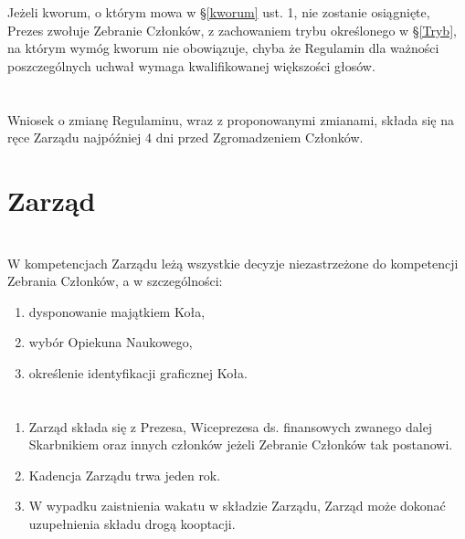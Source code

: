 \documentclass[a4paper]{article}
\begin{document}
\section{}
Jeżeli kworum, o którym mowa w \S \ref{kworum} ust. 1, nie zostanie osiągnięte, Prezes zwołuje Zebranie Członków, z zachowaniem trybu określonego w \S \ref{Tryb}, na którym wymóg kworum nie obowiązuje, chyba że Regulamin dla ważności poszczególnych uchwał wymaga kwalifikowanej większości głosów. 

\section{}
Wniosek o zmianę Regulaminu, wraz z proponowanymi zmianami, składa się na ręce Zarządu najpóźniej 4 dni przed Zgromadzeniem Członków.

\section*{Zarząd~~~}
\section{}
W kompetencjach Zarządu leżą wszystkie decyzje niezastrzeżone do kompetencji Zebrania Członków, a w szczególności:
\begin{enumerate}[label=\alph*)]
\item dysponowanie majątkiem Koła,
\item wybór Opiekuna Naukowego,
\item określenie identyfikacji graficznej Koła.
\end{enumerate}

\section{}
\begin{enumerate}
\item Zarząd składa się z Prezesa, Wiceprezesa ds. finansowych zwanego dalej Skarbnikiem oraz innych członków jeżeli Zebranie Członków tak postanowi.
\item Kadencja Zarządu trwa jeden rok.
\item W wypadku zaistnienia wakatu w składzie Zarządu, Zarząd może dokonać uzupełnienia składu drogą
kooptacji.
\end{enumerate}
\end{document}
